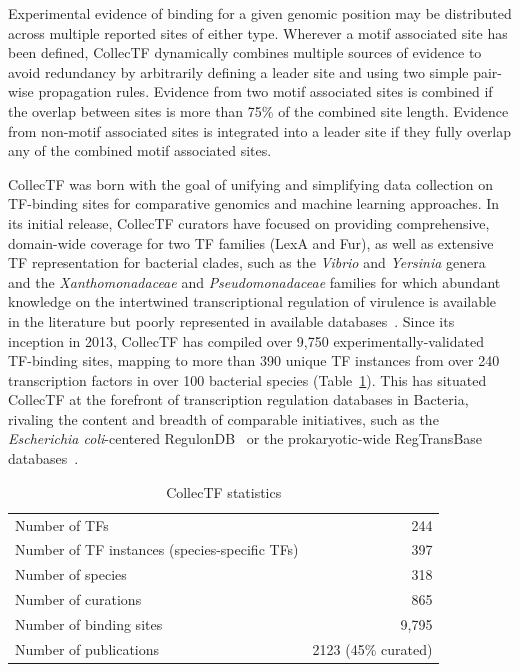 Experimental evidence of binding for a given genomic position may be
distributed across multiple reported sites of either type. Wherever a motif
associated site has been defined, CollecTF dynamically combines multiple
sources of evidence to avoid redundancy by arbitrarily defining a leader site and using two simple
pair-wise propagation rules. Evidence from two motif associated sites is
combined if the overlap between sites is more than 75\% of the combined site
length. Evidence from non-motif associated sites is integrated into a leader
site if they fully overlap any of the combined motif associated sites.

CollecTF was born with the goal of unifying and simplifying data collection on
TF-binding sites for comparative genomics and machine learning approaches. In
its initial release, CollecTF curators have focused on providing comprehensive,
domain-wide coverage for two TF families (LexA and Fur), as well as extensive
TF representation for bacterial clades, such as the \textit{Vibrio} and
\textit{Yersinia} genera and the \textit{Xanthomonadaceae} and
\textit{Pseudomonadaceae} families for which
abundant knowledge on the intertwined transcriptional regulation of virulence
is available in the literature but poorly represented in available
databases~\citep{matson2007regulatory}. Since its inception in 2013, CollecTF
has compiled over 9,750 experimentally-validated TF-binding sites, mapping to
more than 390 unique TF instances from over 240 transcription factors in over
100 bacterial species (Table~\ref{tab:collectf-stats}). This has situated
CollecTF at the forefront of transcription regulation databases in Bacteria,
rivaling the content and breadth of comparable initiatives, such as the
\textit{Escherichia coli}-centered RegulonDB~\citep{salgado2013regulondb} or the
prokaryotic-wide RegTransBase databases~\citep{kazakov2007regtransbase}.

\begin{table}
  \centering
  \caption{CollecTF statistics}
  \begin{tabular}{l r}
    \toprule
    Number of TFs & 244\\
    Number of TF instances (species-specific TFs) & 397\\
    Number of species & 318\\
    Number of curations & 865\\
    Number of binding sites & 9,795\\
    Number of publications & 2123 (45\% curated)\\
    \bottomrule
  \end{tabular}
  \label{tab:collectf-stats}
\end{table}


